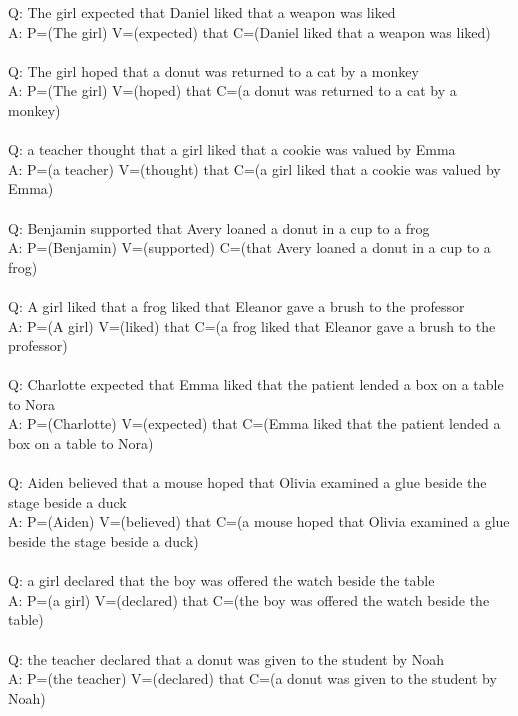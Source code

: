 \documentclass{article} \usepackage{iclr2022_conference,times}
\newcommand{\prompt}[1]{{\footnotesize \textsf{#1}}}
\begin{document}
\prompt{Q: The girl expected that Daniel liked that a weapon was liked \\
A: P=(The girl) V=(expected) that C=(Daniel liked that a weapon was liked) \\
 \\
Q: The girl hoped that a donut was returned to a cat by a monkey \\
A: P=(The girl) V=(hoped) that C=(a donut was returned to a cat by a monkey) \\
 \\
Q: a teacher thought that a girl liked that a cookie was valued by Emma \\
A: P=(a teacher) V=(thought) that C=(a girl liked that a cookie was valued by Emma) \\
 \\
Q: Benjamin supported that Avery loaned a donut in a cup to a frog \\
A: P=(Benjamin) V=(supported) C=(that Avery loaned a donut in a cup to a frog) \\
 \\
Q: A girl liked that a frog liked that Eleanor gave a brush to the professor \\
A: P=(A girl) V=(liked) that C=(a frog liked that Eleanor gave a brush to the professor) \\
 \\
Q: Charlotte expected that Emma liked that the patient lended a box on a table to Nora \\
A: P=(Charlotte) V=(expected) that C=(Emma liked that the patient lended a box on a table to Nora) \\
 \\
Q: Aiden believed that a mouse hoped that Olivia examined a glue beside the stage beside a duck \\
A: P=(Aiden) V=(believed) that C=(a mouse hoped that Olivia examined a glue beside the stage beside a duck) \\
 \\
Q: a girl declared that the boy was offered the watch beside the table \\
A: P=(a girl) V=(declared) that C=(the boy was offered the watch beside the table) \\
 \\
Q: the teacher declared that a donut was given to the student by Noah \\
A: P=(the teacher) V=(declared) that C=(a donut was given to the student by Noah) \\
 \\
}
\end{document}
